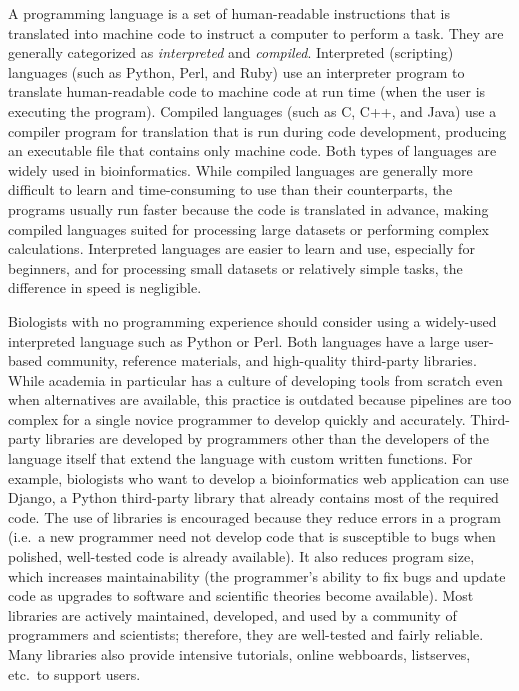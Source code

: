 \documentclass[ChapterTOCs,krantz2]{krantz} %
\begin{document}
A programming language is a set of human-readable instructions that is translated into
machine code to instruct a computer to perform a task.
They are generally categorized as \emph{interpreted} and \emph{compiled}.
Interpreted (scripting) languages (such as Python, Perl, and Ruby) use an
interpreter program to translate human-readable
code to machine code at run time (when the user is executing the
program). Compiled languages (such as C, C++, and Java)
use a compiler program for translation that is run 
during code development, producing an executable file that
contains only machine code. Both types of languages are widely used in
bioinformatics. While compiled languages are generally more difficult to learn
and time-consuming to use than their counterparts, the 
programs usually run faster because the code is translated in advance,
making compiled languages suited for processing large
datasets or performing complex calculations. Interpreted languages are
easier to learn and use, especially for beginners, and for processing 
small datasets or relatively simple
tasks, the difference in speed is negligible. 

Biologists with no programming experience should consider using a widely-used 
interpreted language such as Python or Perl.
Both languages have a large user-based community, reference materials, and
high-quality third-party libraries.
While academia in particular has a culture of 
developing tools from scratch even when alternatives are available, this practice
is outdated because pipelines are too complex for a single novice programmer 
to develop quickly and accurately\cite{Wilson2006}. Third-party libraries are developed 
by programmers other than the developers of the language itself that extend the language
with custom written functions.  For example,   
biologists who want to develop a bioinformatics web application 
can use Django, a Python third-party library that already contains most of the required 
code.  The use of libraries is encouraged because they
reduce errors in a program (i.e.\ a new programmer need not 
develop code that is susceptible to bugs when
polished, well-tested code is already available). It also reduces program size, 
which increases maintainability (the programmer's ability to fix 
bugs and update code as upgrades to software and scientific theories
become available).
Most libraries are actively maintained, developed, and used
by a community of programmers and scientists; therefore, they are well-tested
and fairly reliable. Many libraries also provide intensive tutorials, online
webboards, listserves, etc.\ to support users. 
\end{document}
